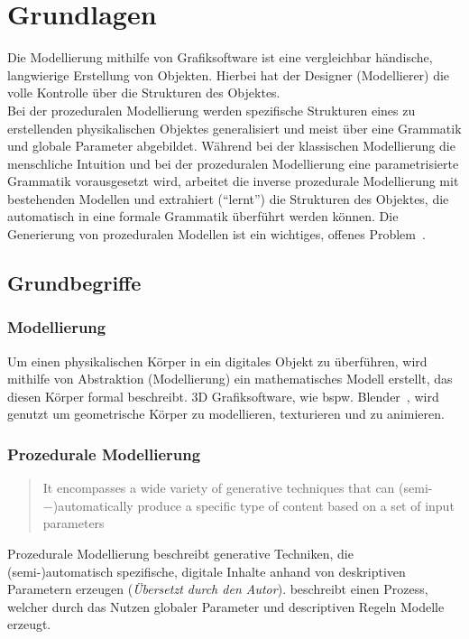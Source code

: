 
\chapter{Grundlagen}

Die Modellierung mithilfe von Grafiksoftware ist eine vergleichbar händische, langwierige Erstellung von
Objekten.
Hierbei hat der Designer (Modellierer) die volle Kontrolle über die Strukturen des Objektes.\\
Bei der prozeduralen Modellierung werden spezifische Strukturen eines zu erstellenden physikalischen Objektes
generalisiert und meist über eine Grammatik und globale Parameter abgebildet.
Während bei der klassischen Modellierung die menschliche Intuition und bei der prozeduralen Modellierung eine
parametrisierte Grammatik vorausgesetzt wird, arbeitet die inverse prozedurale Modellierung mit bestehenden Modellen und
extrahiert ("`lernt"') die Strukturen des Objektes, die automatisch in eine formale Grammatik überführt werden können.
Die Generierung von prozeduralen Modellen ist ein wichtiges, offenes Problem~\cite{benes_2011}.

\section{Grundbegriffe}

\subsection*{Modellierung}
Um einen physikalischen Körper in ein digitales Objekt zu überführen, wird mithilfe von Abstraktion (Modellierung)
ein mathematisches Modell erstellt, das diesen Körper formal beschreibt.
3D Grafiksoftware, wie bspw. Blender~\cite{blender}, wird genutzt um geometrische Körper zu modellieren, texturieren
und zu animieren.
\subsection*{Prozedurale Modellierung}
\begin{quote}
    It encompasses a wide variety of generative techniques that
    can (semi-−)automatically produce a specific type of content based on a set of input
    parameters~\cite{smelik_2014}
\end{quote}
Prozedurale Modellierung beschreibt generative Techniken, die \\(semi-)automatisch spezifische, digitale
Inhalte anhand von deskriptiven Parametern erzeugen (\textit{Übersetzt durch den Autor}).
\citeauthor{smelik_2014} beschreibt einen Prozess, welcher durch das Nutzen globaler Parameter und descriptiven Regeln
Modelle erzeugt.
